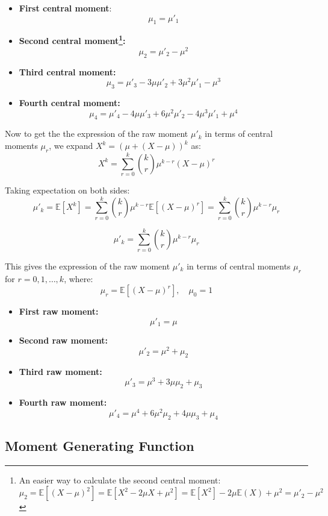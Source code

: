 \documentclass[twoside]{book}
\begin{document}
\begin{itemize}
\item \textbf{First central moment}:
$$\mu_1 = \mu'_1$$
  \item \textbf{Second central moment\footnote{An easier way to calculate the second central moment: \[
  \mu_2 = \mathbb{E}[(X - \mu)^2]
  = \mathbb{E}[X^2 - 2\mu X + \mu^2]
  = \mathbb{E}[X^2] - 2\mu \mathbb{E}(X) + \mu^2
  = \mu'_2 - \mu^2
  \]}:}
  \[
  \mu_2 = \mu'_2 - \mu^2
  \]


  \item \textbf{Third central moment:}
  \[
  \mu_3 = \mu'_3 - 3\mu \mu'_2 + 3\mu^2 \mu'_1 - \mu^3
  \]

  \item \textbf{Fourth central moment:}
  \[
  \mu_4 = \mu'_4 - 4\mu \mu'_3 + 6\mu^2 \mu'_2 - 4\mu^3 \mu'_1 + \mu^4
  \]
\end{itemize}


Now to get the the expression of the raw moment \(\mu'_k\) in terms of central moments \(\mu_r\), we expand \(X^k = (\mu + (X - \mu))^k\) as:
\[
X^k = \sum_{r=0}^{k} \binom{k}{r} \mu^{k - r} (X - \mu)^r
\]

Taking expectation on both sides:
\[
\mu'_k = \mathbb{E}[X^k] = \sum_{r=0}^{k} \binom{k}{r} \mu^{k - r} \mathbb{E}[(X - \mu)^r]
= \sum_{r=0}^{k} \binom{k}{r} \mu^{k - r} \mu_r
\]
\begin{textbox}
    \[
\mu'_k = \sum_{r=0}^{k} \binom{k}{r} \mu^{k - r} \mu_r
\]
\end{textbox}

This gives the expression of the raw moment \(\mu'_k\) in terms of central moments \(\mu_r\) for \(r = 0, 1, \ldots, k\), where:
\[
\mu_r = \mathbb{E}[(X - \mu)^r], \quad \mu_0 = 1
\]

\begin{itemize}
  \item \textbf{First raw moment:}
  \[
  \mu'_1 = \mu
  \]

  \item \textbf{Second raw moment:}
  \[
  \mu'_2 = \mu^2 + \mu_2
  \]

  \item \textbf{Third raw moment:}
  \[
  \mu'_3 = \mu^3 + 3\mu \mu_2 + \mu_3
  \]

  \item \textbf{Fourth raw moment:}
  \[
  \mu'_4 = \mu^4 + 6\mu^2 \mu_2 + 4\mu \mu_3 + \mu_4
  \]
\end{itemize}

\subsection{Moment Generating Function}
\end{document}
